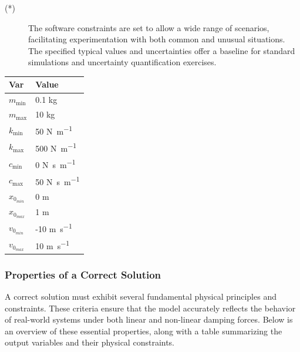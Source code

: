 \documentclass[12pt]{article}
\begin{document}
\noindent 
\begin{description}
\item[(*)] The software constraints are set to allow a wide range of scenarios, 
facilitating experimentation with both common and unusual situations. 
The specified typical values and uncertainties offer a baseline for standard 
simulations and uncertainty quantification exercises.
\end{description}

\begin{table}[h]
\caption{Specification Parameter Values} \label{TblSpecParams}
\renewcommand{\arraystretch}{1.2}
\noindent \begin{longtable*}{l l} 
  \toprule
  \textbf{Var} & \textbf{Value} \\
  \midrule 
  $m_\text{min}$ & 0.1 \si{\kilogram}\\
  $m_\text{max}$ & 10 \si{\kilogram}\\

  $k_\text{min}$ & 50 \si{\newton\per\meter}\\
  $k_\text{max}$ & 500 \si{\newton\per\meter}\\

  $c_\text{min}$ & 0 \si{\newton\second\per\metre}\\
  $c_\text{max}$ & 50 \si{\newton\second\per\metre}\\

  $x_{0_{min}}$ & 0 \si{\metre}\\
  $x_{0_{max}}$ & 1 \si{\metre}\\

  $v_{0_{min}}$ & -10 \si{\metre\per\second}\\
  $v_{0_{max}}$ & 10 \si{\metre\per\second}\\
  \bottomrule
\end{longtable*}
\end{table}

\newpage

\subsubsection{Properties of a Correct Solution} \label{sec_CorrectSolution}

\noindent
A correct solution must exhibit several fundamental physical principles and 
constraints. These criteria ensure that the model accurately reflects the 
behavior of real-world systems under both linear and non-linear damping 
forces. Below is an overview of these essential properties, along with a 
table summarizing the output variables and their physical constraints.
\end{document}
